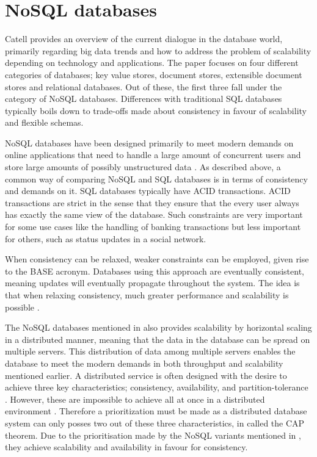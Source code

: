 \section{NoSQL databases}
Catell \cite{Catell} provides an overview of the current dialogue in the database world, primarily regarding big data trends and how to address the problem of scalability depending on technology and applications. The paper focuses on four different categories of databases; key value stores, document stores, extensible document stores and relational databases. Out of these, the first three fall under the category of NoSQL databases. Differences with traditional SQL databases typically boils down to trade-offs made about consistency in favour of scalability and flexible schemas. 

NoSQL databases have been designed primarily to meet modern demands on online applications that need to handle a large amount of concurrent users and store large amounts of possibly unstructured data \cite{Catell}.
As described above, a common way of comparing NoSQL and SQL databases is in terms of consistency and demands on it. SQL databases typically have ACID \cite{Mullins} transactions. ACID transactions are strict in the sense that they ensure that the every user always has exactly the same view of the database. Such constraints are very important for some use cases like the handling of banking transactions but less important for others, such as status updates in a social network.

When consistency can be relaxed, weaker constraints can be employed, given rise to the BASE \cite{Catell} acronym. Databases using this approach are eventually consistent, meaning updates will eventually propagate throughout the system. The idea is that when relaxing consistency, much greater performance and scalability is possible \cite{Catell}.

The NoSQL databases mentioned in \cite{Catell} also provides scalability by horizontal scaling in a distributed manner, meaning that the data in the database can be spread on multiple servers. This distribution of data among multiple servers enables the database to meet the modern demands in both throughput and scalability \cite{Abadi} mentioned earlier. A distributed service is often designed with the desire to achieve three key characteristics; consistency, availability, and partition-tolerance \cite{Brewer}. However, these are impossible to achieve all at once in a distributed environment \cite{Brewer}. Therefore a prioritization must be made as a distributed database system can only posses two out of these three characteristics, in \cite{Brewer} called the CAP theorem. Due to the prioritisation made by the NoSQL variants mentioned in \cite{Catell}, they achieve scalability and availability in favour for consistency. 

